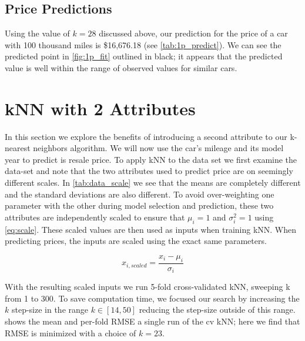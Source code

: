 \documentclass[11pt, fleqn]{article}
\begin{document}


\subsection{Price Predictions}

Using the value of $k=28$ discussed above, our prediction for the price of a car with 100 thousand miles is \$16,676.18 (see \cref{tab:1p_predict}). We can see the predicted point in \cref{fig:1p_fit} outlined in black; it appears that the predicted value is well within the range of observed values for similar cars.



\section{kNN with 2 Attributes}\label{sec:2p}

In this section we explore the benefits of introducing a second attribute to our k-nearest neighbors algorithm. We will now use the car's mileage and its model year to predict is resale price.  To apply kNN to the data set we first examine the data-set and note that the two attributes used to predict price are on seemingly different scales.  In \cref{tab:data_scale} we see that the means are completely different and the standard deviations are also different. To avoid over-weighting one parameter with the other during model selection and prediction, these two attributes are independently scaled to ensure that $\mu_i=1$ and $\sigma_i^2=1$ using \cref{eq:scale}.  These scaled values are then used as inputs when training kNN.  When predicting prices, the inputs are scaled using the exact same parameters.

\begin{equation}\label{eq:scale}
x_{i,scaled} = \frac{x_i-\mu_i}{\sigma_i} 
\end{equation}



With the resulting scaled inputs we run 5-fold cross-validated kNN, sweeping k from 1 to 300.  To save computation time, we focused our search by increasing the $k$ step-size in the range $k\in[14,50]$ reducing the step-size outside of this range.  shows the mean and per-fold RMSE a single run of the cv kNN; here we find that RMSE is minimized with a choice of $k=23$.
\end{document}
